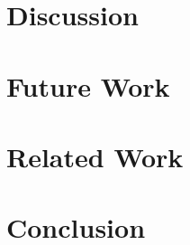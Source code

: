 \documentclass[10pt]{sigplanconf}
\begin{document}
\section{Discussion}


\section{Future Work}


\section{Related Work}


\section{Conclusion}


\acks








%

{


}

\end{document}
